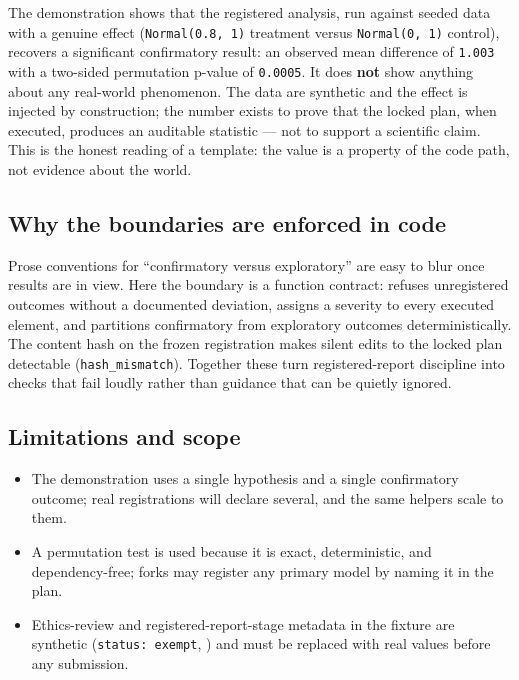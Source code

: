\documentclass[
]{article}
\providecommand{\tightlist}{%
  \setlength{\itemsep}{0pt}\setlength{\parskip}{0pt}}
\begin{document}
The demonstration shows that the registered analysis, run against seeded
data with a genuine effect (\texttt{Normal(0.8,\ 1)} treatment versus
\texttt{Normal(0,\ 1)} control), recovers a significant confirmatory
result: an observed mean difference of \texttt{1.003} with a two-sided
permutation p-value of \texttt{0.0005}. It does \textbf{not} show
anything about any real-world phenomenon. The data are synthetic and the
effect is injected by construction; the number exists to prove that the
locked plan, when executed, produces an auditable statistic --- not to
support a scientific claim. This is the honest reading of a template:
the value is a property of the code path, not evidence about the world.

\subsection{Why the boundaries are enforced in
code}\label{why-the-boundaries-are-enforced-in-code}

Prose conventions for ``confirmatory versus exploratory'' are easy to
blur once results are in view. Here the boundary is a function contract:
 refuses unregistered
outcomes without a documented deviation,
 assigns a severity to every executed
element, and  partitions confirmatory from
exploratory outcomes deterministically. The content hash on the frozen
registration makes silent edits to the locked plan detectable
(\texttt{hash\_mismatch}). Together these turn registered-report
discipline into checks that fail loudly rather than guidance that can be
quietly ignored.

\subsection{Limitations and scope}\label{limitations-and-scope}

\begin{itemize}
\tightlist
\item
  The demonstration uses a single hypothesis and a single confirmatory
  outcome; real registrations will declare several, and the same helpers
  scale to them.
\item
  A permutation test is used because it is exact, deterministic, and
  dependency-free; forks may register any primary model by naming it in
  the plan.
\item
  Ethics-review and registered-report-stage metadata in the fixture are
  synthetic (\texttt{status:\ exempt},
  ) and must be replaced
  with real values before any submission.
\end{itemize}
\end{document}
